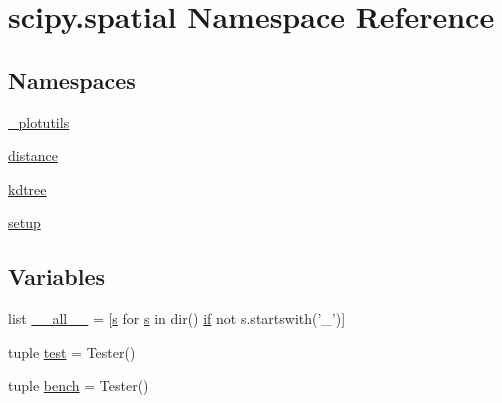 \hypertarget{namespacescipy_1_1spatial}{}\section{scipy.\+spatial Namespace Reference}
\label{namespacescipy_1_1spatial}
\subsection*{Namespaces}
\begin{DoxyCompactItemize}
\item 
 \hyperlink{namespacescipy_1_1spatial_1_1__plotutils}{\+\_\+plotutils}
\item 
 \hyperlink{namespacescipy_1_1spatial_1_1distance}{distance}
\item 
 \hyperlink{namespacescipy_1_1spatial_1_1kdtree}{kdtree}
\item 
 \hyperlink{namespacescipy_1_1spatial_1_1setup}{setup}
\end{DoxyCompactItemize}
\subsection*{Variables}
\begin{DoxyCompactItemize}
\item 
list \hyperlink{namespacescipy_1_1spatial_a20fc1ad122cc3a448b249c5d924fc5c0}{\+\_\+\+\_\+all\+\_\+\+\_\+} = \mbox{[}\hyperlink{indexexpr_8h_ae024b0db549122b44c349ae28ec990dc}{s} for \hyperlink{indexexpr_8h_ae024b0db549122b44c349ae28ec990dc}{s} in dir() \hyperlink{minmax_8h_a30a0ee9fee303f01d9c5e6f669e0dfe9}{if} not s.\+startswith('\+\_\+')\mbox{]}
\item 
tuple \hyperlink{namespacescipy_1_1spatial_a9a201637fcd0d98a27b5a6f80349abe2}{test} = Tester()
\item 
tuple \hyperlink{namespacescipy_1_1spatial_a5b7d767a9ff3163062223a0372e4b3fe}{bench} = Tester()
\end{DoxyCompactItemize}


